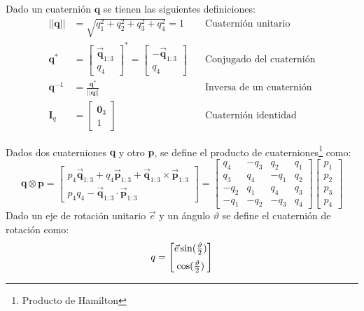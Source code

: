 Dado un cuaternión \(\mathbf{q}\) se tienen las siguientes definiciones:
%
\begin{align}
	||\mathbf{q}|| &= \sqrt{q_1^2 + q_2^2 + q_3^2 + q_4^2} = 1  \quad &\text{Cuaternión unitario} \label{eq:quat_unit} \\
	\mathbf{q}^* &= \begin{bmatrix}
		\vec{\mathbf{q}}_{1:3} \\ 
		q_4
	\end{bmatrix}^* = 
	\begin{bmatrix}
		-\vec{\mathbf{q}}_{1:3} \\ 
		q_4
	\end{bmatrix} \quad &\text{Conjugado del cuaternión} \label{eq:conjugate_cuat} \\ 
	\mathbf{q}^{-1} &= \frac{\mathbf{q}^*}{||\mathbf{q}||} \quad &\text{Inversa de un cuaternión} \label{eq:inverse_quat} \\ 
	\mathbf{I}_q &= \begin{bmatrix}
		\mathbf{0}_3 \\
		1  
	\end{bmatrix} \quad &\text{Cuaternión identidad} \label{eq:identity_quat}
\end{align}



Dados dos cuaterniones $\mathbf{q}$ y otro $\mathbf{p}$, se define el producto de cuaterniones\footnote{Producto de Hamilton} como: 
\begin{equation}
	\mathbf{q} \otimes \mathbf{p} = \begin{bmatrix}
		p_4 \vec{\mathbf{q}}_{1:3}+q_4\vec{\mathbf{p}}_{1:3} + \vec{\mathbf{q}}_{1:3} \times \vec{\mathbf{p}}_{1:3}\\
		p_4 q_4 - 	\vec{\mathbf{q}}_{1:3} \cdot 	\vec{\mathbf{p}}_{1:3}
	\end{bmatrix} = 
    \begin{bmatrix} 
    	q_4 & -q_3 &q_2& q_1 \\ 
    	q_3 & q_4& -q_1& q_2 \\ 
    	-q_2 & q_1 & q_4& q_3 \\ 
    	-q_1 & -q_2&-q_3& q_4  
	\end{bmatrix}\begin{bmatrix}
	p_1 \\ p_2 \\ p_3 \\ p_4
	\end{bmatrix}
\end{equation} 
Dado un eje de rotación unitario $\vec{e}$ y un ángulo $\vartheta$ se define el cuaternión de rotación como:
\begin{equation}
	\textbf{q} = \begin{bmatrix}
 		\vspace{2mm}
 		\vec{e} \sin(\frac{\vartheta}{2} ) \\
		\cos(\frac{\vartheta}{2} )
	\end{bmatrix}
\end{equation}

